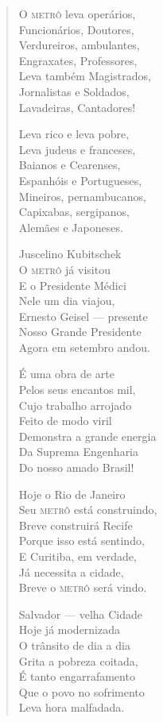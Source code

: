 \begin{verse}
O \textsc{metrô} leva operários, \\
Funcionários, Doutores, \\
Verdureiros, ambulantes, \\
Engraxates, Professores, \\
Leva também Magistrados, \\
Jornalistas e Soldados, \\
Lavadeiras, Cantadores! 

Leva rico e leva pobre, \\
Leva judeus e franceses, \\
Baianos e Cearenses, \\
Espanhóis e Portugueses, \\
Mineiros, pernambucanos, \\
Capixabas, sergipanos, \\
Alemães e Japoneses. 

Juscelino Kubitschek \\
O \textsc{metrô} já visitou \\
E o Presidente Médici \\
Nele um dia viajou, \\
Ernesto Geisel ---  presente \\
Nosso Grande Presidente \\
Agora em setembro andou. 
\pagebreak

É uma obra de arte \\
Pelos seus encantos mil, \\
Cujo trabalho arrojado \\
Feito de modo viril \\
Demonstra a grande energia \\
Da Suprema Engenharia \\
Do nosso amado Brasil! 

Hoje o Rio de Janeiro \\
Seu \textsc{metrô} está construindo, \\
Breve construirá Recife \\
Porque isso está sentindo, \\
E Curitiba, em verdade, \\
Já necessita a cidade, \\
Breve o \textsc{metrô} será vindo. 

Salvador ---  velha Cidade \\
Hoje já modernizada \\
O trânsito de dia a dia \\
Grita a pobreza coitada, \\
É tanto engarrafamento \\
Que o povo no sofrimento \\
Leva hora malfadada. 


\end{verse}
